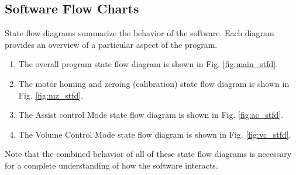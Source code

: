\documentclass[]{article}
\begin{document}
\begin{appendices}
	
	



\section{Software Flow Charts}
\label{app:sfd}

State flow diagrams summarize the behavior of the software.  Each diagram provides an overview of a particular aspect of the program.
\begin{enumerate}
	\item The overall program state flow diagram is shown in Fig. \ref{fig:main_stfd}.
	\item The motor homing and zeroing (calibration) state flow diagram is shown in Fig. \ref{fig:mz_stfd}.
	\item The Assist control Mode state flow diagram is shown in Fig. \ref{fig:ac_stfd}.
	\item The Volume Control Mode state flow diagram is shown in Fig. \ref{fig:vc_stfd}.
\end{enumerate}

Note that the combined behavior of all of these state flow diagrams is necessary for a complete understanding of how the software interacts.


\end{appendices}
\end{document}
